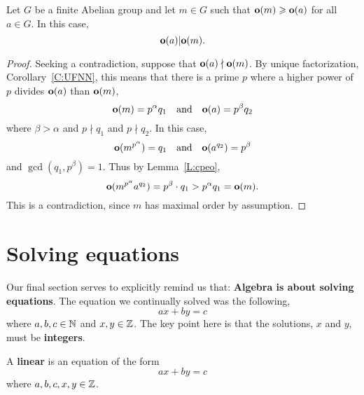 \documentclass{ximera}
\begin{document}
\begin{corollary}\label{C:odmo}
  Let $G$ be a finite Abelian group and let $m\in G$ such that $\mathbf o(m)
  \geqslant \mathbf o(a)$ for all $a\in G$. In this case,
  \[
  \mathbf o(a) | \mathbf o(m).
  \]
  \begin{proof}
    Seeking a contradiction, suppose that $\mathbf o(a) \nmid \mathbf o(m)$. By
    unique factorization, Corollary~\ref{C:UFNN}, this means that
    there is a prime $p$ where a higher power of $p$ divides $\mathbf o(a)$
    than $\mathbf o(m)$,
    \[
    \mathbf o(m) = p^\alpha q_1 \quad\text{and}\quad \mathbf o(a) = p^\beta q_2  
    \]
    where $\beta>\alpha$ and $p\nmid q_1$ and $p\nmid q_2$. In this case,
    \[
    \mathbf o(m^{p^\alpha}) = q_1\quad\text{and}\quad \mathbf o(a^{q_2}) = p^\beta
    \]
    and $\gcd(q_1,p^\beta) = 1$. Thus by Lemma~\ref{L:cpeo},
    \[
    \mathbf o(m^{p^\alpha}a^{q_2}) = p^\beta\cdot q_1> p^\alpha q_1 = \mathbf o(m).
    \]
    This is a contradiction, since $m$ has maximal order by
    assumption.
  \end{proof}
\end{corollary}











\section{Solving equations}

Our final section serves to explicitly remind us that: \textbf{Algebra
  is about solving equations}. The equation we continually solved was
the following,
\[
ax + by = c
\]
where $a,b,c\in\mathbb N$ and $x,y\in\mathbb Z$. The key point here is that the
solutions, $x$ and $y$, must be \textbf{integers}.

\begin{definition}
  A \textbf{linear}  is an equation of the
  form
  \[
  ax + by = c
  \]
  where $a,b,c,x,y\in\mathbb Z$.
\end{definition}
\end{document}
